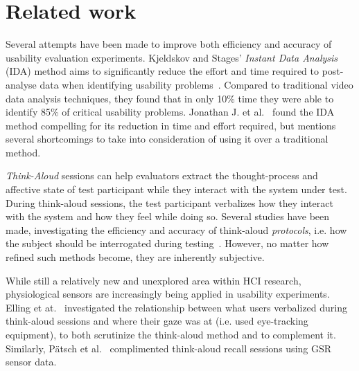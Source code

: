\section{Related work}
Several attempts have been made to improve both efficiency and accuracy of
usability evaluation experiments. Kjeldskov and Stages' \textit{Instant Data
Analysis} (IDA) method aims to significantly reduce the effort and time required
to post-analyse data when identifying usability
problems~\cite{instant_data_analysis}. Compared to traditional video data
analysis techniques, they found that in only 10\% time they were able to
identify 85\% of critical usability problems. Jonathan J. et
al.~\cite{use_of_TA_and_IDA} found the IDA
method compelling for its reduction in time and effort required, but mentions
several shortcomings to take into consideration of using it over a traditional
method.

\textit{Think-Aloud} sessions can help evaluators extract the thought-process
and affective state of test participant while they interact with the system
under test. During think-aloud sessions, the test participant verbalizes how
they interact with the system and how they feel while doing so.  Several studies
have been made, investigating the efficiency and accuracy of think-aloud
\textit{protocols}, i.e. how the subject should be interrogated during
testing~\cite{two_think_aloud_protocols_study}. However, no matter how refined
such methods become, they are inherently subjective.

While still a relatively new and unexplored area within HCI research,
physiological sensors are increasingly being applied in usability experiments.
Elling et at.~\cite{concurrent_think_aloud_eye_tracking} investigated the
relationship between what users verbalized during think-aloud sessions and where
their gaze was at (i.e. used eye-tracking equipment), to both scrutinize the
think-aloud method and to complement it. Similarly, P\"{a}tsch et
al.~\cite{using_sensor_graphs_think_aloud} complimented think-aloud recall
sessions using GSR sensor data.

